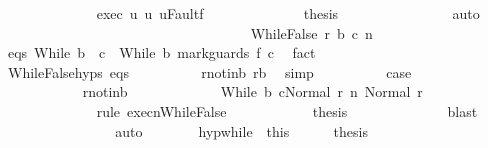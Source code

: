\begin{isabellebody}
\ \ \ \ \ \ \ \ \ \ \ \ \isamarkupfalse%
\ exec\ u{\isacharprime}\ u\ u{\isacharprime}{\isacharunderscore}Fault{\isacharunderscore}f\isanewline
\ \ \ \ \ \ \ \ \ \ \ \ \isamarkupfalse%
\ {\isacharquery}thesis\isanewline
\ \ \ \ \ \ \ \ \ \ \ \ \ \ \isamarkupfalse%
\ auto\isanewline
\ \ \ \ \ \ \ \ \ \ \isamarkupfalse%
\isanewline
\ \ \ \ \ \ \ \ \isamarkupfalse%
\isanewline
\ \ \ \ \ \ \isamarkupfalse%
\isanewline
\ \ \ \ \ \ \ \ \isamarkupfalse%
\ {\isacharparenleft}WhileFalse\ r\ b{\isacharprime}\ c{\isacharprime}{\isacharprime}\ n{\isacharparenright}\isanewline
\ \ \ \ \ \ \ \ \isamarkupfalse%
\ eqs{\isacharcolon}\ {\isachardoublequoteopen}While\ b{\isacharprime}\ \ c{\isacharprime}{\isacharprime}\ {\isacharequal}\ While\ b\ {\isacharparenleft}mark{\isacharunderscore}guards\ f\ c{\isacharparenright}{\isachardoublequoteclose}\ \isamarkupfalse%
\ fact\isanewline
\ \ \ \ \ \ \ \ \isamarkupfalse%
\ WhileFalse{\isachardot}hyps\ eqs\isanewline
\ \ \ \ \ \ \ \ \isamarkupfalse%
\ r{\isacharunderscore}not{\isacharunderscore}in{\isacharunderscore}b{\isacharcolon}\ {\isachardoublequoteopen}r{\isasymnotin}b{\isachardoublequoteclose}\ \isamarkupfalse%
\ simp\isanewline
\ \ \ \ \ \ \ \ \isamarkupfalse%
\ {\isacharquery}case\isanewline
\ \ \ \ \ \ \ \ \isamarkupfalse%
\ {\isacharminus}\isanewline
\ \ \ \ \ \ \ \ \ \ \isamarkupfalse%
\ r{\isacharunderscore}not{\isacharunderscore}in{\isacharunderscore}b\ \isanewline
\ \ \ \ \ \ \ \ \ \ \isamarkupfalse%
\ {\isachardoublequoteopen}{\isasymGamma}{\isasymturnstile}{\isasymlangle}While\ b\ c{\isacharcomma}Normal\ r{\isasymrangle}\ {\isacharequal}n{\isasymRightarrow}\ Normal\ r{\isachardoublequoteclose}\isanewline
\ \ \ \ \ \ \ \ \ \ \ \ \isamarkupfalse%
\ {\isacharparenleft}rule\ execn{\isachardot}WhileFalse{\isacharparenright}\isanewline
\ \ \ \ \ \ \ \ \ \ \isamarkupfalse%
\ {\isacharquery}thesis\isanewline
\ \ \ \ \ \ \ \ \ \ \ \ \isamarkupfalse%
\ blast\isanewline
\ \ \ \ \ \ \ \ \isamarkupfalse%
\isanewline
\ \ \ \ \ \ \isamarkupfalse%
\ auto\isanewline
\ \ \ \ \isacommand{{\isacharbraceright}}\isamarkupfalse%
\ \isamarkupfalse%
\ hyp{\isacharunderscore}while\ {\isacharequal}\ this\isanewline
\ \ \ \ \isamarkupfalse%
\ {\isacharquery}thesis\isanewline

\end{isabellebody}
